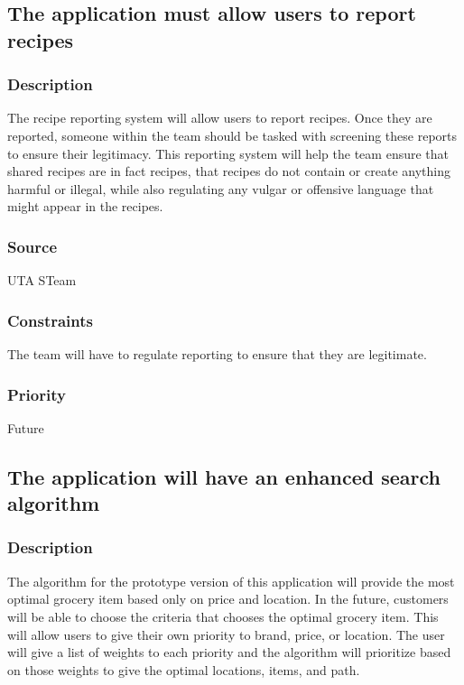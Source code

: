 \subsection{The application must allow users to report recipes}
\subsubsection{Description}
The recipe reporting system will allow users to report recipes. Once they are reported, someone within the team should be tasked with screening these reports to ensure their legitimacy. This reporting system will help the team ensure that shared recipes are in fact recipes, that recipes do not contain or create anything harmful or illegal, while also regulating any vulgar or offensive language that might appear in the recipes.
\subsubsection{Source}
UTA STeam
\subsubsection{Constraints}
The team will have to regulate reporting to ensure that they are legitimate.
\subsubsection{Priority}
Future

\subsection{The application will have an enhanced search algorithm}
\subsubsection{Description}
The algorithm for the prototype version of this application  will provide the most optimal grocery item based only on price and location. In the future, customers will be able to choose the criteria that chooses the optimal grocery item. This will allow users to give their own priority to brand, price, or location. The user will give a list of weights to each priority and the algorithm will prioritize based on those weights to give the optimal locations, items, and path.
